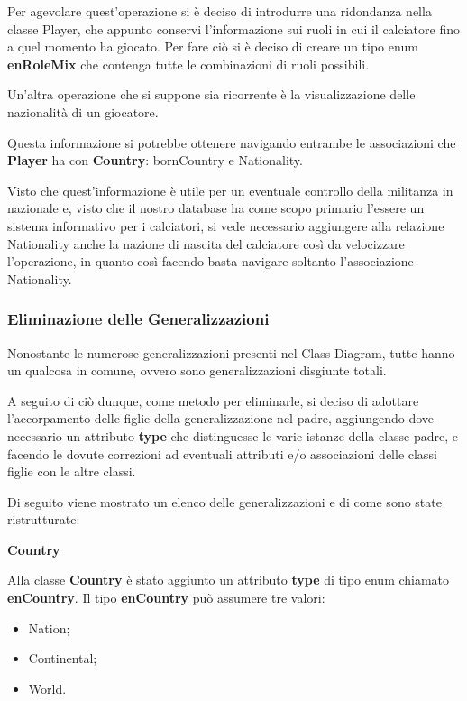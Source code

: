 Per agevolare quest'operazione si è deciso di introdurre
una ridondanza nella classe Player, che appunto conservi
l'informazione sui ruoli in cui il calciatore fino a
quel momento ha giocato.
Per fare ciò si è deciso di creare un tipo enum
\textbf{enRoleMix} che contenga tutte le combinazioni
di ruoli possibili.



Un'altra operazione che si suppone sia ricorrente è
la visualizzazione delle 
nazionalità di un giocatore.

Questa informazione si potrebbe ottenere navigando 
entrambe le associazioni che \textbf{Player} ha con 
\textbf{Country}: bornCountry e Nationality.

Visto che quest'informazione è utile per un eventuale
controllo della militanza in nazionale e,
visto che il nostro database ha come scopo primario l'essere 
un sistema informativo per i calciatori, si vede necessario 
aggiungere alla relazione Nationality anche la nazione di 
nascita del calciatore così da velocizzare l'operazione, in 
quanto così facendo basta navigare soltanto l'associazione 
Nationality.


\newpage
\subsubsection{Eliminazione delle Generalizzazioni}

Nonostante le numerose generalizzazioni presenti nel Class 
Diagram, tutte hanno un qualcosa in comune, ovvero sono 
generalizzazioni disgiunte totali.

A seguito di ciò dunque, come metodo per eliminarle, si 
deciso di adottare l'accorpamento delle figlie della 
generalizzazione nel padre, aggiungendo dove necessario un 
attributo \textbf{type} che distinguesse le varie istanze 
della classe padre, e facendo le dovute correzioni ad 
eventuali attributi e/o associazioni delle classi figlie
con le altre classi.

Di seguito viene mostrato un elenco delle generalizzazioni e 
di come sono state ristrutturate:

\bigskip
\textbf{Country}
\bigskip

Alla classe \textbf{Country} è stato aggiunto un attributo 
\textbf{type} di tipo enum chiamato \textbf{enCountry}.
Il tipo \textbf{enCountry} può assumere tre valori:
\begin{itemize}
	\item Nation;
	\item Continental;
	\item World.
\end{itemize}

